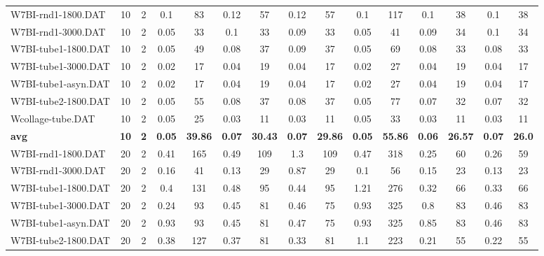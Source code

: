 \begin{table}[!ht]
{\begin{tabular}{lcccccccccccccc}
W7BI-rnd1-1800.DAT & 10 & 2 &  \textcolor{blue2}{0.1} & 83 & 0.12 & 57 & 0.12 & 57 &  \textcolor{blue2}{0.1} & 117 &  \textcolor{blue2}{0.1} & 38 &  \textcolor{blue2}{0.1} & 38 \\
W7BI-rnd1-3000.DAT & 10 & 2 &  \textcolor{blue2}{0.05} & 33 & 0.1 & 33 & 0.09 & 33 &  \textcolor{blue2}{0.05} & 41 & 0.09 & 34 & 0.1 & 34 \\
W7BI-tube1-1800.DAT & 10 & 2 &  \textcolor{blue2}{0.05} & 49 & 0.08 & 37 & 0.09 & 37 &  \textcolor{blue2}{0.05} & 69 & 0.08 & 33 & 0.08 & 33 \\
W7BI-tube1-3000.DAT & 10 & 2 &  \textcolor{blue2}{0.02} & 17 & 0.04 & 19 & 0.04 & 17 &  \textcolor{blue2}{0.02} & 27 & 0.04 & 19 & 0.04 & 17 \\
W7BI-tube1-asyn.DAT & 10 & 2 &  \textcolor{blue2}{0.02} & 17 & 0.04 & 19 & 0.04 & 17 &  \textcolor{blue2}{0.02} & 27 & 0.04 & 19 & 0.04 & 17 \\
W7BI-tube2-1800.DAT & 10 & 2 &  \textcolor{blue2}{0.05} & 55 & 0.08 & 37 & 0.08 & 37 &  \textcolor{blue2}{0.05} & 77 & 0.07 & 32 & 0.07 & 32 \\
Wcollage-tube.DAT & 10 & 2 & 0.05 & 25 &  \textcolor{blue2}{0.03} & 11 &  \textcolor{blue2}{0.03} & 11 & 0.05 & 33 &  \textcolor{blue2}{0.03} & 11 &  \textcolor{blue2}{0.03} & 11 \\
\cline{1-15} \textbf{avg} & \textbf{10} & \textbf{2} & \textbf{0.05} & \textbf{39.86} & \textbf{0.07} & \textbf{30.43} & \textbf{0.07} & \textbf{29.86} & \textbf{0.05} & \textbf{55.86} & \textbf{0.06} & \textbf{26.57} & \textbf{0.07} & \textbf{26.0} \\ \cline{1-15}
W7BI-rnd1-1800.DAT & 20 & 2 & 0.41 & 165 & 0.49 & 109 & 1.3 & 109 & 0.47 & 318 &  \textcolor{blue2}{0.25} & 60 & 0.26 & 59 \\
W7BI-rnd1-3000.DAT & 20 & 2 & 0.16 & 41 & 0.13 & 29 & 0.87 & 29 &  \textcolor{blue2}{0.1} & 56 & 0.15 & 23 & 0.13 & 23 \\
W7BI-tube1-1800.DAT & 20 & 2 & 0.4 & 131 & 0.48 & 95 & 0.44 & 95 & 1.21 & 276 &  \textcolor{blue2}{0.32} & 66 & 0.33 & 66 \\
W7BI-tube1-3000.DAT & 20 & 2 &  \textcolor{blue2}{0.24} & 93 & 0.45 & 81 & 0.46 & 75 & 0.93 & 325 & 0.8 & 83 & 0.46 & 83 \\
W7BI-tube1-asyn.DAT & 20 & 2 & 0.93 & 93 &  \textcolor{blue2}{0.45} & 81 & 0.47 & 75 & 0.93 & 325 & 0.85 & 83 & 0.46 & 83 \\
W7BI-tube2-1800.DAT & 20 & 2 & 0.38 & 127 & 0.37 & 81 & 0.33 & 81 & 1.1 & 223 &  \textcolor{blue2}{0.21} & 55 & 0.22 & 55 \\

\end{tabular}}
\end{table}
